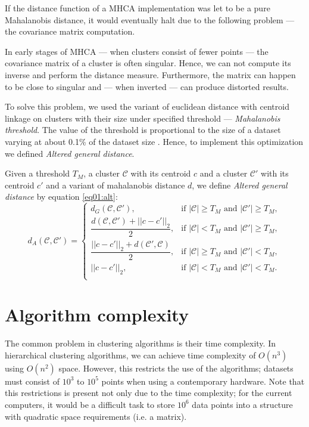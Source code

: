 If the distance function of a MHCA implementation was let to be a pure Mahalanobis distance, it would eventually halt due to the following problem --- the covariance matrix computation.

In early stages of MHCA --- when clusters consist of fewer points --- the covariance matrix of a cluster is often singular. Hence, we can not compute its inverse and perform the distance measure. Furthermore, the matrix can happen to be close to singular and --- when inverted --- can produce distorted results.

To solve this problem, we used the variant of euclidean distance with centroid linkage on clusters with their size under specified threshold --- \emph{Mahalanobis threshold}. The value of the threshold is proportional to the size of a dataset varying at about 0.1\% of the dataset size \cite{fivser2012detection}. Hence, to implement this optimization we defined \emph{Altered general distance}.

\begin{defn}
	Given a threshold $T_M$, a cluster $\mathcal{C}$ with its centroid $c$ and a cluster $\mathcal{C}'$ with its centroid $c'$ and a variant of mahalanobis distance $d$, we define \emph{Altered general distance} by equation \ref{eq01:alt}:
	\begin{equation}
	d_A(\mathcal{C},\mathcal{C}')=
	\begin{cases}
	d_G(\mathcal{C}, \mathcal{C}'), & \text{if $|\mathcal{C}|\ge T_M$ and $|\mathcal{C}'|\ge T_M$},\\
	\dfrac{d(\mathcal{C}, \mathcal{C}')+||c-c'||_2}{2}, & \text{if $|\mathcal{C}| < T_M$ and $|\mathcal{C}'|\ge T_M$},\\
	\dfrac{||c-c'||_2+d(\mathcal{C}', \mathcal{C})}{2}, & \text{if $|\mathcal{C}|\ge T_M$ and $|\mathcal{C}'|< T_M$},\\
	||c-c'||_2, & \text{if $|\mathcal{C}|< T_M$ and $|\mathcal{C}'|< T_M$}.\\
	\end{cases}
	\label{eq01:alt}
	\end{equation}
	\label{def01:alt}
\end{defn}



\section{Algorithm complexity}

The common problem in clustering algorithms is their time complexity. In hierarchical clustering algorithms, we can achieve time complexity of $O(n^3)$ using $O(n^2)$ space. However, this restricts the use of the algorithms; datasets must consist of $10^3$ to $10^5$ points when using a contemporary hardware. Note that this restrictions is present not only due to the time complexity; for the current computers, it would be a difficult task to store $10^6$ data points into a structure with quadratic space requirements (i.e. a matrix).

